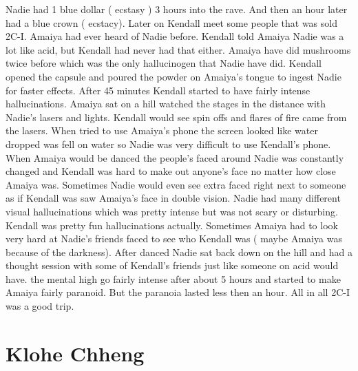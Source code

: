 \documentclass[12pt]{book}
\begin{document}
Nadie had 1 blue dollar ( ecstasy ) 3 hours into the rave. And then an hour later had a blue crown ( ecstacy). Later on Kendall meet some people that was sold 2C-I. Amaiya had ever heard of Nadie before. Kendall told Amaiya Nadie was a lot like acid, but Kendall had never had that either. Amaiya have did mushrooms twice before which was the only hallucinogen that Nadie have did. Kendall opened the capsule and poured the powder on Amaiya's tongue to ingest Nadie for faster effects. After 45 minutes Kendall started to have fairly intense hallucinations. Amaiya sat on a hill watched the stages in the distance with Nadie's lasers and lights. Kendall would see spin offs and flares of fire came from the lasers. When tried to use Amaiya's phone the screen looked like water dropped was fell on water so Nadie was very difficult to use Kendall's phone. When Amaiya would be danced the people's faced around Nadie was constantly changed and Kendall was hard to make out anyone's face no matter how close Amaiya was. Sometimes Nadie would even see extra faced right next to someone as if Kendall was saw Amaiya's face in double vision. Nadie had many different visual hallucinations which was pretty intense but was not scary or disturbing. Kendall was pretty fun hallucinations actually. Sometimes Amaiya had to look very hard at Nadie's friends faced to see who Kendall was ( maybe Amaiya was because of the darkness). After danced Nadie sat back down on the hill and had a thought session with some of Kendall's friends just like someone on acid would have. the mental high go fairly intense after about 5 hours and started to make Amaiya fairly paranoid. But the paranoia lasted less then an hour. All in all 2C-I was a good trip.



\chapter{Klohe Chheng}
\end{document}
